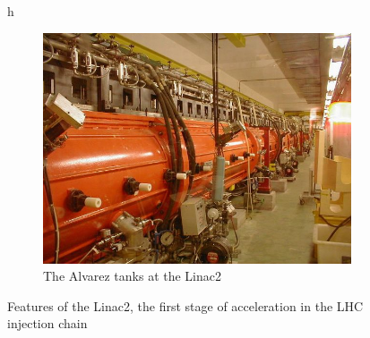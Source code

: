 \begin{figure}{h}
\begin{subfigure}[h]{0.4\textwidth}
        \includegraphics[width=\textwidth]{Figures/LHC_Diagrams/LHC__Linac2__AlvarezTubes.jpg}
        \caption{The Alvarez tanks at the Linac2}\label{fig:alvarez_tank_actual}
      \end{subfigure}
      \caption{Features of the Linac2, the first stage of
        acceleration in the LHC injection chain} \label{fig:linac2}
\end{figure}

